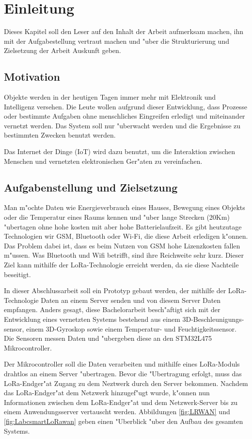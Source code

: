 
\chapter{Einleitung}

Dieses Kapitel soll den Leser auf den Inhalt der Arbeit 
aufmerksam machen, ihn mit der Aufgabestellung vertraut 
machen und "uber die Strukturierung und Zielsetzung der 
Arbeit Auskunft geben.


\section{Motivation}
Objekte werden in der heutigen Tagen immer mehr mit 
Elektronik und Intelligenz versehen. Die Leute wollen 
aufgrund dieser Entwicklung, dass Prozesse oder 
bestimmte Aufgaben ohne menschliches Eingreifen 
erledigt und miteinander vernetzt werden. Das System 
soll nur "uberwacht werden und die Ergebnisse zu 
bestimmten Zwecken benutzt werden.

Das Internet der Dinge (\ac{IoT}) wird dazu benutzt, um 
die Interaktion zwischen Menschen und vernetzten 
elektronischen Ger"aten zu vereinfachen. 


\section{Aufgabenstellung und Zielsetzung}
Man m"ochte Daten wie Energieverbrauch eines Hauses, 
Bewegung eines Objekts oder die Temperatur eines Raums 
kennen und "uber lange Strecken (20Km) "ubertagen ohne 
hohe kosten mit aber hohe Batterielaufzeit. Es gibt 
heutzutage Technologien wir \ac{GSM}, Bluetooth oder Wi-Fi, 
die diese Arbeit erledigen k"onnen. Das Problem dabei 
ist, dass es beim Nutzen von GSM hohe Lizenzkosten 
fallen m"ussen. Was Bluetooth und Wifi betrifft, sind 
ihre Reichweite sehr kurz. Dieser Ziel kann mithilfe 
der LoRa-Technologie erreicht werden, da sie diese 
Nachteile beseitigt.  

In dieser Abschlussarbeit soll ein Prototyp gebaut 
werden, der mithilfe der LoRa-Technologie Daten an 
einem Server senden und von diesem Server Daten 
empfangen. Anders gesagt, diese Bachelorarbeit 
besch"aftigt sich mit der Entwicklung eines vernetzten 
Systems bestehend aus einem 3D-Beschleunigungs-sensor, 
einem 3D-Gyroskop sowie einem Tem\-peratur- und 
Feuchtigkeitssensor. Die Sensoren messen Daten und 
"ubergeben diese an den STM32L475 Mikrocontroller.

Der Mikrocontroller soll die Daten verarbeiten und mithilfe eines 
LoRa-Moduls\cite{AT_Command} drahtlos an 
einem Server "ubertragen. Bevor die "Ubertragung 
erfolgt, muss das LoRa-Endger"at Zugang zu dem Neztwerk 
durch den Server bekommen. Nachdem das LoRa-Endger"at 
dem Netzwerk hinzugef"ugt wurde, k"onnen nun 
Informationen zwischen dem LoRa-Endger"at und dem 
Netzwerk-Server bis zu einem Anwendungsserver 
vertauscht werden. Abbildungen \ref{fig:LRWAN} und 
\ref{fig:LabcsmartLoRawan} geben einen "Uberblick "uber 
den Aufbau des gesamten Systems.

